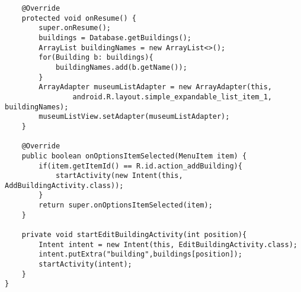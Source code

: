 \begin{lstlisting}
    @Override
    protected void onResume() {
        super.onResume();
        buildings = Database.getBuildings();
        ArrayList buildingNames = new ArrayList<>();
        for(Building b: buildings){
            buildingNames.add(b.getName());
        }
        ArrayAdapter museumListAdapter = new ArrayAdapter(this,
                android.R.layout.simple_expandable_list_item_1, buildingNames);
        museumListView.setAdapter(museumListAdapter);
    }

    @Override
    public boolean onOptionsItemSelected(MenuItem item) {
        if(item.getItemId() == R.id.action_addBuilding){
            startActivity(new Intent(this, AddBuildingActivity.class));
        }
        return super.onOptionsItemSelected(item);
    }

    private void startEditBuildingActivity(int position){
        Intent intent = new Intent(this, EditBuildingActivity.class);
        intent.putExtra("building",buildings[position]);
        startActivity(intent);
    }
}
\end{lstlisting}
\newpage
